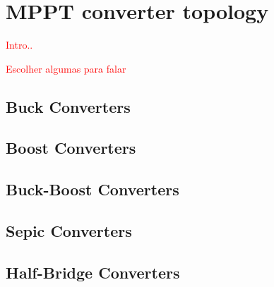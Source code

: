 \section{MPPT converter topology}

\textcolor{red}{Intro..}

\textcolor{red}{Escolher algumas para falar}

\subsection{Buck Converters}

\subsection{Boost Converters}

\subsection{Buck-Boost Converters}

\subsection{Sepic Converters}

\subsection{Half-Bridge Converters}